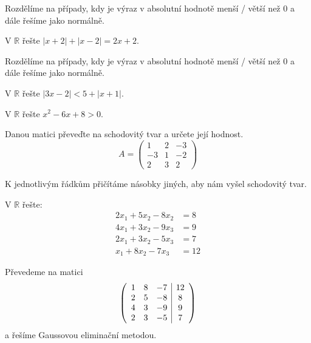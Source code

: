 \begin{reseni}
Rozdělíme na případy, kdy je výraz v absolutní hodnotě menší / větší než 0
a dále řešíme jako normálně.
\end{reseni}

\begin{priklad}
V $\mathbb R$ řešte $|x+2|+|x-2|=2x+2.$
\end{priklad}

\begin{reseni}
Rozdělíme na případy, kdy je výraz v absolutní hodnotě menší / větší než 0
a dále řešíme jako normálně.
\end{reseni}

\begin{priklad}
V $\mathbb R$ řešte $|3x-2|<5+|x+1|.$
\end{priklad}

\begin{priklad}
V $\mathbb R$ řešte $x^2-6x+8 >0.$
\end{priklad}

\begin{priklad}
Danou matici převeďte na schodovitý tvar a určete její hodnost.
$$A=\begin{pmatrix}
    1 & 2 & -3 \\
    -3 & 1 & -2 \\
    2 & 3 & 2
\end{pmatrix}$$
\end{priklad}

\begin{reseni}
K jednotlivým řádkům přičítáme násobky jiných, aby nám vyšel schodovitý tvar.
\end{reseni}

\begin{priklad}
V $\mathbb R$ řešte:
\begin{align*}
    2x_1+5x_2-8x_2 & =8 \\
    4x_1 + 3x_2 - 9x_3 & =9\\
    2x_1 + 3x_2 - 5x_3 & = 7 \\
    x_1 + 8x_2 - 7x_3 & = 12
\end{align*}
\end{priklad}

\begin{reseni}
Převedeme na matici
$$
\left (
\begin{array}{c c c | c }
1 & 8& -7& 12\\
2& 5& -8& 8\\
4& 3& -9& 9\\
2& 3& -5& 7
\end{array}
\right )
$$
a řešíme Gaussovou eliminační metodou.
\end{reseni}

